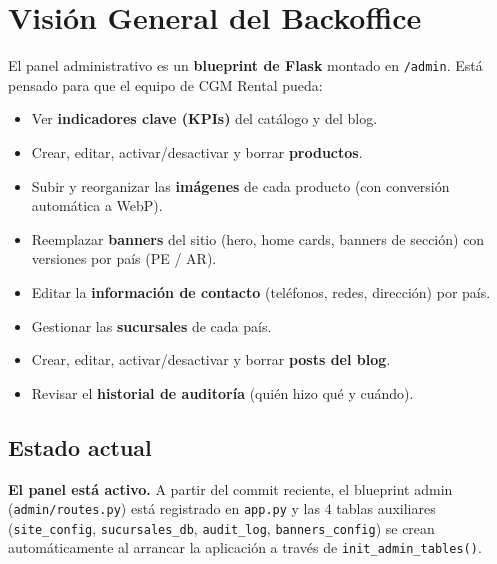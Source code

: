 \documentclass[11pt,a4paper]{article}
\begin{document}
\vspace{0.4cm}
\tableofcontents
\newpage

\section{Visión General del Backoffice}

El panel administrativo es un \textbf{blueprint de Flask} montado en
\texttt{/admin}. Está pensado para que el equipo de CGM Rental pueda:

\begin{itemize}[leftmargin=*]
    \item Ver \textbf{indicadores clave (KPIs)} del catálogo y del blog.
    \item Crear, editar, activar/desactivar y borrar \textbf{productos}.
    \item Subir y reorganizar las \textbf{imágenes} de cada producto (con
        conversión automática a WebP).
    \item Reemplazar \textbf{banners} del sitio (hero, home cards, banners
        de sección) con versiones por país (PE / AR).
    \item Editar la \textbf{información de contacto} (teléfonos, redes,
        dirección) por país.
    \item Gestionar las \textbf{sucursales} de cada país.
    \item Crear, editar, activar/desactivar y borrar \textbf{posts del
        blog}.
    \item Revisar el \textbf{historial de auditoría} (quién hizo qué y
        cuándo).
\end{itemize}

\subsection{Estado actual}

\begin{infobox}
\textbf{El panel está activo.} A partir del commit reciente, el blueprint
admin (\texttt{admin/routes.py}) está registrado en \texttt{app.py} y las
4 tablas auxiliares (\texttt{site\_config}, \texttt{sucursales\_db},
\texttt{audit\_log}, \texttt{banners\_config}) se crean automáticamente al
arrancar la aplicación a través de \texttt{init\_admin\_tables()}.
\end{infobox}
\end{document}
